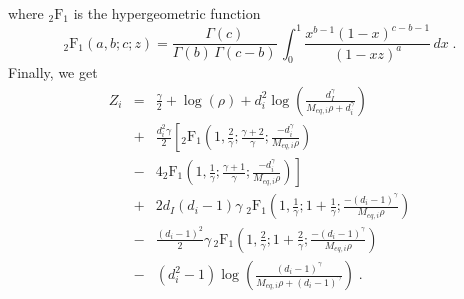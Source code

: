 where $\mbox{$_2$F$_1$}$ is the hypergeometric function 
\begin{equation}
 \mbox{$_2$F$_1$}(a,b;c;z)=\frac{\Gamma(c)}{\Gamma(b)\,\Gamma(c-b)}\,\int_0^1\frac{x^{b-1}(1-x)^{c-b-1}}{(1-xz)^a}\,dx\;.
\end{equation}
Finally, we get 
\begin{eqnarray}
	Z_i&=&
          \frac{\gamma}{2}+\log(\rho)+ d_i^2 \log\left(\frac{d_I^\gamma}{M_{eq,i}\rho+d_i^\gamma}\right) \nonumber\\
          &+&\frac{d_i^2\gamma}{2}\left[\mbox{$_2$F$_1$}\left(1,\frac{2}{\gamma};\frac{\gamma+2}{\gamma};\frac{-d_i^\gamma}{M_{eq,i}\rho}\right)\right.\nonumber\\
         &-&\left.4\mbox{$_2$F$_1$}\left(1,\frac{1}{\gamma};\frac{\gamma+1}{\gamma};\frac{-d_i^\gamma}{M_{eq,i}\rho}\right)\right] 
          \nonumber\\
          &+&2d_I(d_i-1)\gamma \;\mbox{$_2$F$_1$}\left(1,\frac{1}{\gamma};1+\frac{1}{\gamma};\frac{-(d_i-1)^\gamma}{M_{eq,i}\rho}\right)\nonumber\\
             &-&\frac{(d_i-1)^2}{2}\gamma\, \mbox{$_2$F$_1$}\left(1,\frac{2}{\gamma};1+\frac{2}{\gamma};\frac{-(d_i-1)^\gamma}{M_{eq,i}\rho}\right)\nonumber\\
             &-& (d_i^2-1) \log\left(\frac{(d_i-1)^\gamma}{M_{eq,i}\rho+(d_i-1)^\gamma}\right) \;.\label{zeta_i}
\end{eqnarray}
